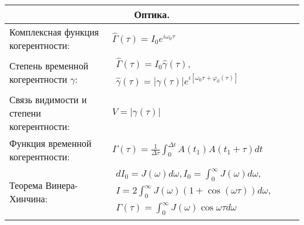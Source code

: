 \documentclass{article}
\begin{document}
\begin{tabular}{ |p{4.2cm}|p{5.3cm}|p{6cm}|p{3.5cm}|  }
\hline
\multicolumn{4}{|c|}{Оптика.} \\
\hline
Комплексная функция когерентности:                                           &  %
$\hat{\Gamma}(\tau) = I_0 e^{i \omega_0 \tau}$                               &  %
                                                                             &  %
                                                                             \\ %
\hline
Степень временной когерентности $\gamma$:                                    &  %
$\begin{aligned}
\hat{\Gamma}(\tau) = I_0 \hat{\gamma}(\tau),  \\
\hat{\gamma}(\tau) = | \gamma (\tau) | e^{i[\omega_0 \tau + \varphi_0(\tau)]}
\end{aligned}$                                                               &  %
                                                                             &  %
                                                                             \\ %
\hline
Связь видимости и степени когерентности:                                     &  %
$V = |\gamma(\tau)|$                                                         &  %
                                                                             &  %
                                                                             \\ %
\hline
Функция временной когерентности:                                             &  %
$\Gamma(\tau) = \frac{1}{\Delta \tau}
 \int_0^{\Delta t} A(t_1) A(t_1 + \tau) dt$                                         &  %
                                                                             &  %
                                                                             \\ %
\hline
Теорема Винера-Хинчина:                                                      &  %
$\begin{aligned}
dI_0 = J(\omega) d\omega, I_0 = \int_0^\infty J(\omega) d\omega, \\
I = 2 \int_0^\infty J(\omega)(1 + \cos(\omega \tau)) d\omega,    \\
\Gamma(\tau) = \int_0^{\infty} J(\omega) \cos{\omega \tau} d \omega
\end{aligned}$                                                               &  %

\end{tabular}
\end{document}

